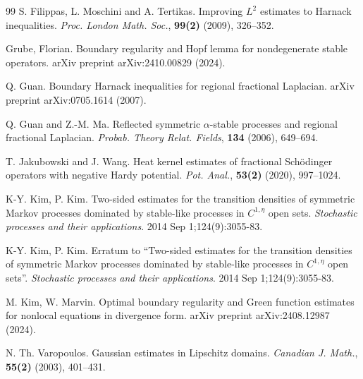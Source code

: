 \documentclass[12pt,a4paper]{amsart}
\numberwithin{equation}{section}
\theoremstyle{plain}
\newcommand{\1}{\mathbbm{1}}
\begin{document}
\begin{thebibliography}{99}
S. Filippas, 
L. Moschini and A. Tertikas. 
Improving $L^2$ estimates to Harnack inequalities.
\emph{Proc. London Math. Soc.}, \textbf{99(2)} (2009), 326--352.

 Grube, Florian. Boundary regularity and Hopf lemma for nondegenerate stable operators. arXiv preprint arXiv:2410.00829 (2024).

 Q. Guan. Boundary Harnack inequalities for regional fractional Laplacian. arXiv preprint arXiv:0705.1614 (2007).

 Q. Guan and Z.-M. Ma.  Reflected symmetric $\alpha$-stable processes
and regional fractional Laplacian. \emph{Probab. Theory Relat. Fields}, \textbf{134} (2006), 649--694.

 T. Jakubowski and J.  Wang.
Heat kernel estimates of fractional Sch\"{o}dinger operators with negative Hardy potential.
\emph{Pot. Anal.}, \textbf{53(2)} (2020), 997--1024.

 K-Y. Kim, P. Kim. 
Two-sided estimates for the transition densities of symmetric Markov processes dominated by stable-like processes in $C^{1, \eta}$ open sets. \emph{Stochastic processes and their applications}. 2014 Sep 1;124(9):3055-83.

 K-Y. Kim, P. Kim. 
Erratum to “Two-sided estimates for the transition densities of symmetric Markov processes dominated by stable-like processes in $C^{1, \eta}$ open sets”.
\emph{Stochastic processes and their applications}. 2014 Sep 1;124(9):3055-83.

 M. Kim, W. Marvin. Optimal boundary regularity and Green function estimates for nonlocal equations in divergence form. arXiv preprint arXiv:2408.12987 (2024).

 N. Th. Varopoulos. Gaussian estimates in Lipschitz domains.
\emph{Canadian J. Math.}, \textbf{55(2)} (2003), 401--431.

\end{thebibliography}
\end{document}
